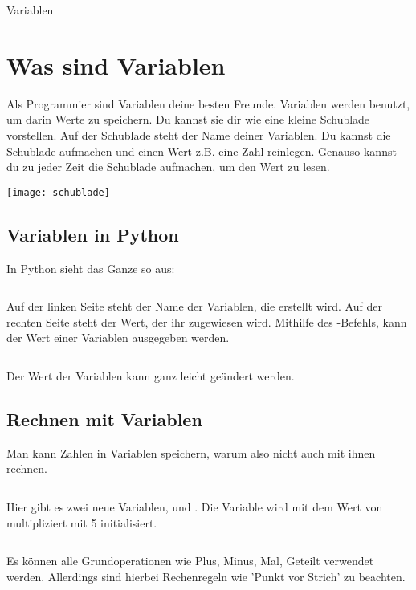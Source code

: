 \documentclass{\VorlagenPfad/coderdojokatext}
\newcommand{\Titel}{Variablen}
\begin{document}
\begin{center}
	{\huge \Titel}
\end{center}

\section{Was sind Variablen}
Als Programmier sind Variablen deine besten Freunde. Variablen werden benutzt, um darin Werte zu speichern. Du kannst sie dir wie eine kleine Schublade vorstellen. Auf der Schublade steht der Name deiner Variablen. Du kannst die Schublade aufmachen und einen Wert z.B. eine Zahl reinlegen. Genauso kannst du zu jeder Zeit die Schublade aufmachen, um den Wert zu lesen.

\begin{center}
\texttt{[image: schublade]}
\end{center}

\subsection{Variablen in Python}
In Python sieht das Ganze so aus:

\inputminted[firstline=1, lastline=4]{python}{../../../Beispiele/variablen.py}

Auf der linken Seite steht der Name der Variablen, die erstellt wird. Auf der rechten Seite steht der Wert, der ihr zugewiesen wird.
Mithilfe des -Befehls, kann der Wert einer Variablen ausgegeben werden.


\inputminted[firstline=7, lastline=8]{python}{../../../Beispiele/variablen.py}
Der Wert der Variablen kann ganz leicht geändert werden.

\subsection{Rechnen mit Variablen}
Man kann Zahlen in Variablen speichern, warum also nicht auch mit ihnen rechnen.
\inputminted[firstline=11, lastline=15]{python}{../../../Beispiele/variablen.py}

Hier gibt es zwei neue Variablen,  und . Die Variable  wird mit dem Wert
von  multipliziert mit 5 initialisiert.

\inputminted[firstline=16, lastline=21]{python}{../../../Beispiele/variablen.py}
Es können alle Grundoperationen wie Plus, Minus, Mal, Geteilt verwendet werden. Allerdings sind hierbei Rechenregeln wie 'Punkt vor Strich' zu beachten.
\end{document}
